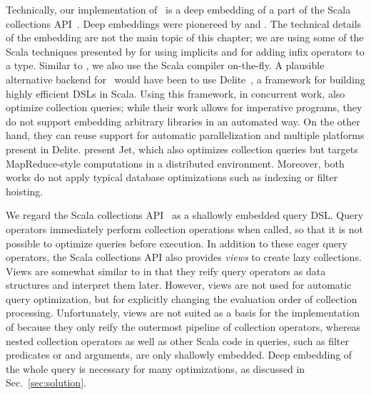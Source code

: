 

\label{sec:rwdsl}
Technically, our implementation of \LoS\ is a deep embedding of a part of the Scala collections API~\citep{odersky2009fighting}.
Deep embeddings were pionereed by \citet{Leijen99DSEC} and \citet{elliott03compiling}. 
The technical
details of the embedding are not the main topic of this chapter; we are using some of the
Scala techniques presented by \citet{rompf2010lightweight} for using implicits and for
adding infix operators to a type. Similar to \citet{rompf2010lightweight}, we also 
use the Scala compiler on-the-fly. A plausible alternative backend for \LoS\ would
have been to use Delite~\citep{Rompf11BBlocks}, a framework for
building highly efficient DSLs in Scala.
Using this framework, in concurrent work, \citet{Rompf13} also optimize
collection queries; while their work allows for imperative programs, they do
not support embedding arbitrary libraries in an automated way. On the other
hand, they can reuse support for automatic parallelization and multiple platforms present in Delite.
\citet{Ackermann12} present Jet, which also optimizes collection queries but
targets MapReduce-style computations in a distributed environment.
Moreover, both works do not apply typical database optimizations such as
indexing or filter hoisting.


We regard the Scala collections API~\citep{odersky2009fighting} as a shallowly embedded query DSL\@. Query operators immediately perform collection operations when called, so that it is not possible to optimize queries before execution. In addition to these eager query operators, the Scala collections API also provides \emph{views} to create lazy collections.
Views are somewhat similar to {\LoS} in that they reify query operators as data structures and interpret them later.
However, views are not used for automatic query optimization, but for explicitly changing the evaluation order of collection processing. Unfortunately, views are not suited as a basis for the implementation of {\LoS} because they only reify the outermost pipeline of collection operators, whereas nested collection operators as well as other Scala code in queries, such as filter predicates or  and  arguments, are only shallowly embedded.
Deep embedding of the whole query is necessary for many optimizations, as discussed in Sec.~\ref{sec:solution}.

